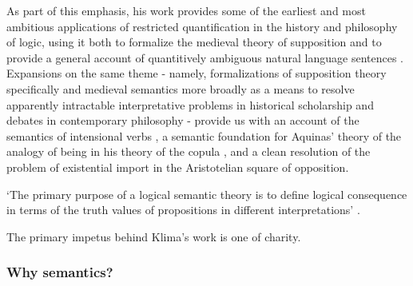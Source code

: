 \documentclass[]{article}
\begin{document}
As part of this emphasis, 
his work provides some of the earliest and most ambitious applications of restricted quantification in the history and philosophy of logic, 
using it both to formalize the medieval theory of supposition and to provide a general account of quantitively ambiguous natural language sentences \autocite{Klima1988,Klima1990,KlimaSandu1990,Klima1991b}. 
Expansions on the same theme - 
namely, formalizations of supposition theory specifically and medieval semantics more broadly as a means to resolve apparently intractable interpretative problems in historical scholarship and debates in contemporary philosophy - 
provide us with an account of the semantics of intensional verbs \autocite{Klima1991}, 
a semantic foundation for Aquinas' theory of the analogy of being in his theory of the copula \autocite{Klima1996,Klima2002}, 
and a clean resolution of the problem of existential import in the Aristotelian square of opposition\autocite{Klima2001}.

\autocite{Parsons2014,Read2015b}

`The primary purpose of a logical semantic theory is to define logical consequence in terms of the truth values of propositions in different interpretations' \autocite[79]{Klima1991b}. 

The primary impetus behind Klima's work is one of charity.

\subsubsection{Why semantics?}

\end{document}
